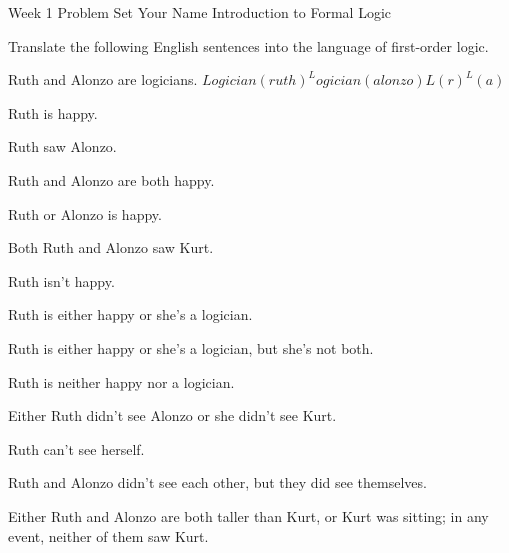 

\heading
Week 1 Problem Set
Your Name
Introduction to Formal Logic
\endheading

Translate the following English sentences into the language of first-order logic.

\problems
{}
Ruth and Alonzo are logicians.
	\answer
	$ Logician(ruth) ^ Logician(alonzo) $\OR$L(r)^L(a)$
	\endanswer

Ruth is happy.
	\answer
	$ $
	\endanswer

Ruth saw Alonzo.
	\answer
	$ $
	\endanswer

Ruth and Alonzo are both happy.
	\answer
	$ $
	\endanswer

Ruth or Alonzo is happy.
	\answer
	$ $
	\endanswer

Both Ruth and Alonzo saw Kurt.
	\answer
	$ $
	\endanswer

Ruth isn't happy.
	\answer
	$ $
	\endanswer

Ruth is either happy or she's a logician.
	\answer
	$ $
	\endanswer

Ruth is either happy or she's a logician, but she's not both.
	\answer
	$ $
	\endanswer

Ruth is neither happy nor a logician.
	\answer
	$ $
	\endanswer

Either Ruth didn't see Alonzo or she didn't see Kurt.
	\answer
	$ $
	\endanswer

Ruth can't see herself.
	\answer
	$ $
	\endanswer

Ruth and Alonzo didn't see each other, but they did see themselves.
	\answer
	$ $
	\endanswer

Either Ruth and Alonzo are both taller than Kurt, or Kurt was sitting; in any event, neither of them saw Kurt.
	\answer
	$ $
	\endanswer

\endproblems
\bye
